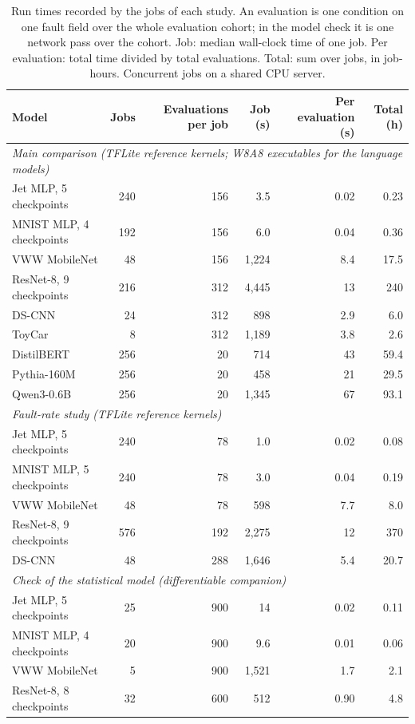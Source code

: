 \begin{table}[h]
\caption{Run times recorded by the jobs of each study. An evaluation is one condition on one fault field over the whole evaluation cohort; in the model check it is one network pass over the cohort. Job: median wall-clock time of one job. Per evaluation: total time divided by total evaluations. Total: sum over jobs, in job-hours. Concurrent jobs on a shared CPU server.}\label{tab:runtimes}
\centering\footnotesize\setlength{\tabcolsep}{5pt}
\begin{tabular}{l r r r r r}\toprule
Model & Jobs & Evaluations per job & Job (s) & Per evaluation (s) & Total (h)\\\midrule
\multicolumn{6}{l}{\emph{Main comparison (TFLite reference kernels; W8A8 executables for the language models)}}\\
Jet MLP, 5 checkpoints & 240 & 156 & 3.5 & 0.02 & 0.23\\
MNIST MLP, 4 checkpoints & 192 & 156 & 6.0 & 0.04 & 0.36\\
VWW MobileNet & 48 & 156 & 1{,}224 & 8.4 & 17.5\\
ResNet-8, 9 checkpoints & 216 & 312 & 4{,}445 & 13 & 240\\
DS-CNN & 24 & 312 & 898 & 2.9 & 6.0\\
ToyCar & 8 & 312 & 1{,}189 & 3.8 & 2.6\\
DistilBERT & 256 & 20 & 714 & 43 & 59.4\\
Pythia-160M & 256 & 20 & 458 & 21 & 29.5\\
Qwen3-0.6B & 256 & 20 & 1{,}345 & 67 & 93.1\\\midrule
\multicolumn{6}{l}{\emph{Fault-rate study (TFLite reference kernels)}}\\
Jet MLP, 5 checkpoints & 240 & 78 & 1.0 & 0.02 & 0.08\\
MNIST MLP, 5 checkpoints & 240 & 78 & 3.0 & 0.04 & 0.19\\
VWW MobileNet & 48 & 78 & 598 & 7.7 & 8.0\\
ResNet-8, 9 checkpoints & 576 & 192 & 2{,}275 & 12 & 370\\
DS-CNN & 48 & 288 & 1{,}646 & 5.4 & 20.7\\\midrule
\multicolumn{6}{l}{\emph{Check of the statistical model (differentiable companion)}}\\
Jet MLP, 5 checkpoints & 25 & 900 & 14 & 0.02 & 0.11\\
MNIST MLP, 4 checkpoints & 20 & 900 & 9.6 & 0.01 & 0.06\\
VWW MobileNet & 5 & 900 & 1{,}521 & 1.7 & 2.1\\
ResNet-8, 8 checkpoints & 32 & 600 & 512 & 0.90 & 4.8\\\bottomrule
\end{tabular}
\end{table}

